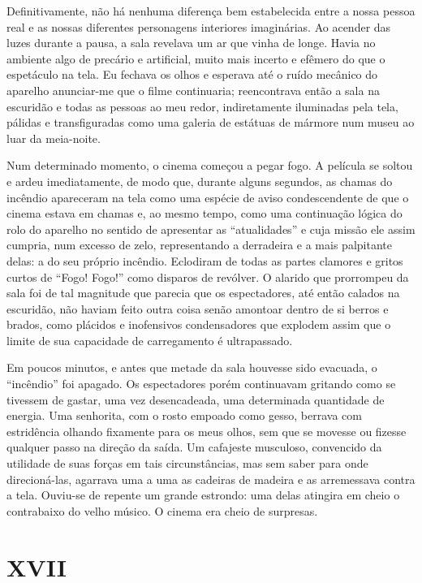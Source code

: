 Definitivamente, não há nenhuma diferença bem estabelecida entre a nossa pessoa real e as nossas diferentes personagens interiores imaginárias. Ao acender das luzes durante a pausa, a sala revelava um ar que vinha de longe. Havia no ambiente algo de precário e artificial, muito mais incerto e efêmero do que o espetáculo na tela. Eu fechava os olhos e esperava até o ruído mecânico do aparelho anunciar-me que o filme continuaria; reencontrava então a sala na escuridão e todas as pessoas ao meu redor, indiretamente iluminadas pela tela, pálidas e transfiguradas como uma galeria de estátuas de mármore num museu ao luar da meia-noite.

Num determinado momento, o cinema começou a pegar fogo. A película se soltou e ardeu imediatamente, de modo que, durante alguns segundos, as chamas do incêndio apareceram na tela como uma espécie de aviso condescendente de que o cinema estava em chamas e, ao mesmo tempo, como uma continuação lógica do rolo do aparelho no sentido de apresentar as ``atualidades'' e cuja missão ele assim cumpria, num excesso de zelo, representando a derradeira e a mais palpitante delas: a do seu próprio incêndio. Eclodiram de todas as partes clamores e gritos curtos de ``Fogo! Fogo!'' como disparos de revólver. O alarido que prorrompeu da sala foi de tal magnitude que parecia que os espectadores, até então calados na escuridão, não haviam feito outra coisa senão amontoar dentro de si berros e brados, como plácidos e inofensivos condensadores que explodem assim que o limite de sua capacidade de carregamento é ultrapassado.

Em poucos minutos, e antes que metade da sala houvesse sido evacuada, o ``incêndio'' foi apagado. Os espectadores porém continuavam gritando como se tivessem de gastar, uma vez desencadeada, uma determinada quantidade de energia. Uma senhorita, com o rosto empoado como gesso, berrava com estridência olhando fixamente para os meus olhos, sem que se movesse ou fizesse qualquer passo na direção da saída. Um cafajeste musculoso, convencido da utilidade de suas forças em tais circunstâncias, mas sem saber para onde direcioná-las, agarrava uma a uma as cadeiras de madeira e as arremessava contra a tela. Ouviu-se de repente um grande estrondo: uma delas atingira em cheio o contrabaixo do velho músico. O cinema era cheio de surpresas.


\chapter*{\centering\Large{XVII}}

